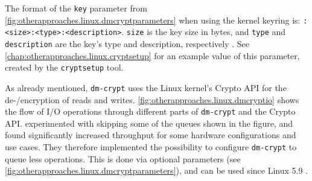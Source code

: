 The format of the \texttt{key} parameter from \autoref{fig:otherapproaches.linux.dmcryptparameters} when using the kernel keyring is: \texttt{:<size>:<type>:<description>}. \texttt{size} is the key size in bytes, and \texttt{type} and \texttt{description} are the key's type and description, respectively \cite{Dmcrypt2020}. See \autoref{chap:otherapproaches.linux.cryptsetup} for an example value of this parameter, created by the \texttt{cryptsetup} tool.

As already mentioned, \texttt{dm-crypt} uses the Linux kernel's Crypto API for the de-/encryption of reads and writes. \autoref{fig:otherapproaches.linux.dmcryptio} shows the flow of I/O operations through different parts of \texttt{dm-crypt} and the Crypto API. \cite{Korchagin2020} experimented with skipping some of the queues shown in the figure, and found significantly increased throughput for some hardware configurations and use cases. They therefore implemented the possibility to configure \texttt{dm-crypt} to queue less operations. This is done via optional parameters (see \autoref{fig:otherapproaches.linux.dmcryptparameters}), and can be used since Linux 5.9 \cite{Dmcrypt2020}.

